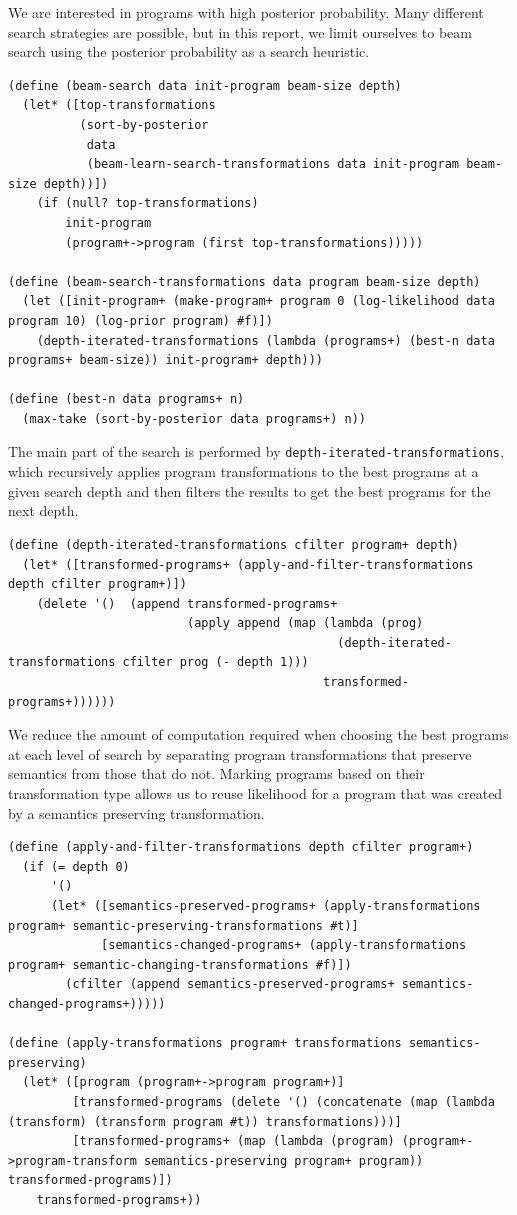 \documentclass[a4paper,10pt]{article}
\begin{document}
We are interested in programs with high posterior probability. Many different search strategies are possible, but in this report, we limit ourselves to beam search using the posterior probability as a search heuristic.

\begin{lstlisting}[frame=trbl]
(define (beam-search data init-program beam-size depth)
  (let* ([top-transformations 
          (sort-by-posterior
           data 
           (beam-learn-search-transformations data init-program beam-size depth))])
    (if (null? top-transformations)
        init-program
        (program+->program (first top-transformations)))))

(define (beam-search-transformations data program beam-size depth)
  (let ([init-program+ (make-program+ program 0 (log-likelihood data program 10) (log-prior program) #f)])
    (depth-iterated-transformations (lambda (programs+) (best-n data programs+ beam-size)) init-program+ depth)))

(define (best-n data programs+ n)
  (max-take (sort-by-posterior data programs+) n))
\end{lstlisting}
The main part of the search is performed by \texttt{depth-iterated-transformations}, which recursively applies program transformations to the best programs at a given search depth and then filters the results to get the best programs for the next depth.
\begin{lstlisting}[frame=trbl]
(define (depth-iterated-transformations cfilter program+ depth)
  (let* ([transformed-programs+ (apply-and-filter-transformations depth cfilter program+)])
    (delete '()  (append transformed-programs+
                         (apply append (map (lambda (prog) 
                                              (depth-iterated-transformations cfilter prog (- depth 1))) 
                                            transformed-programs+))))))
\end{lstlisting}
We reduce the amount of computation required when choosing the best programs at each level of search by separating program transformations that preserve semantics from those that do not.  Marking programs based on their transformation type allows us to reuse likelihood for a program that was created by a semantics preserving transformation.
\begin{lstlisting}[frame=trbl]
(define (apply-and-filter-transformations depth cfilter program+)
  (if (= depth 0)
      '()
      (let* ([semantics-preserved-programs+ (apply-transformations program+ semantic-preserving-transformations #t)]
             [semantics-changed-programs+ (apply-transformations program+ semantic-changing-transformations #f)])
        (cfilter (append semantics-preserved-programs+ semantics-changed-programs+)))))

(define (apply-transformations program+ transformations semantics-preserving)
  (let* ([program (program+->program program+)]
         [transformed-programs (delete '() (concatenate (map (lambda (transform) (transform program #t)) transformations)))]
         [transformed-programs+ (map (lambda (program) (program+->program-transform semantics-preserving program+ program)) transformed-programs)])
    transformed-programs+))
\end{lstlisting}
\end{document}
